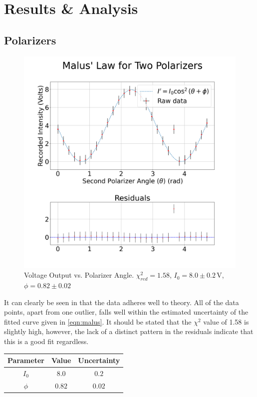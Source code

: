 \documentclass[aip, cp, amsmath, amssymb, reprint]{revtex4-2}
\begin{document}
    \section{Results \& Analysis}
        \subsection{Polarizers}
            \begin{figure}[H]
                \centering
                \includegraphics[width=0.9\linewidth]{../figures/Malus.png}
                \caption{Voltage Output vs. Polarizer Angle. $\chi_{red}^2 = 1.58$, $I_0 = 8.0 \pm 0.2\,\text{V}$, $\phi = 0.82 \pm 0.02$}
                \label{fig:part1}
            \end{figure}

            It can clearly be seen in  that the data adheres well to theory. All of the data points, apart from one outlier, falls well within the estimated uncertainty of the fitted curve given in \eqref{eqn:malus}. It should be stated that the $\chi^2$ value of 1.58 is slightly high, however, the lack of a distinct pattern in the residuals indicate that this is a good fit regardless.

            \begin{table}[H]
                \centering
                \begin{tabular}{c|c|c}
                    \bfseries Parameter & \bfseries Value & \bfseries Uncertainty \\
                    \hline
                    $I_0$ & $8.0$ & $0.2$ \\
                    $\phi$ & $0.82$ & $0.02$ \\
                \end{tabular}
            \end{table}
\end{document}
